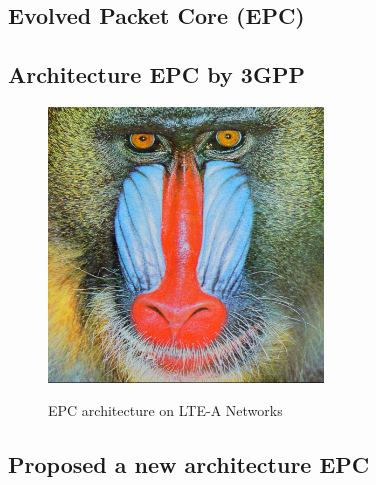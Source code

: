 
\begin{appendices}
	\chapter{Evolved Packet Core (EPC)}
	\label{app:3gpp}
	
	\section{Architecture EPC by 3GPP}
	\label{app:epcv1}
	
	\begin{figure}[h]
		\centering
		\includegraphics [width=0.65\textwidth]{pics/baboon.png} \\
		\caption {EPC architecture on LTE-A Networks}
		\label{fig:epcc1}
	\end{figure}
	
	\section{Proposed a new architecture EPC}
	\label{app:epcv2}
	

\end{appendices}
